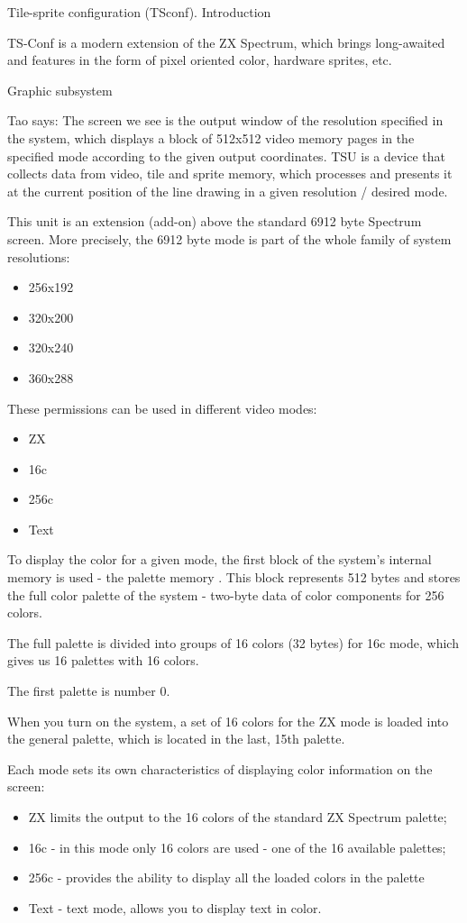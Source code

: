 Tile-sprite configuration (TSconf). Introduction

TS-Conf is a modern extension of the ZX Spectrum, which brings
long-awaited and features in the form of pixel oriented color,
hardware sprites, etc.

Graphic subsystem

Tao says: The screen we see is the output window of the resolution
specified in the system, which displays a block of 512x512 video
memory pages in the specified mode according to the given output
coordinates. TSU is a device that collects data from video, tile and
sprite memory, which processes and presents it at the current position
of the line drawing in a given resolution / desired mode.

This unit is an extension (add-on) above the standard 6912 byte
Spectrum screen. More precisely, the 6912 byte mode is part of the
whole family of system resolutions:
\begin{itemize}
\item 256x192
\item 320x200
\item 320x240
\item 360x288
\end{itemize}

These permissions can be used in different video modes:
\begin{itemize}
\item ZX
\item 16c
\item 256c
\item Text
\end{itemize}

To display the color for a given mode, the first block of the system's
internal memory is used - the palette memory . This block represents
512 bytes and stores the full color palette of the system - two-byte
data of color components for 256 colors.

The full palette is divided into groups of 16 colors (32 bytes) for
16c mode, which gives us 16 palettes with 16 colors.

The first palette is number 0. 

When you turn on the system, a set of 16 colors for the ZX mode is
loaded into the general palette, which is located in the last, 15th
palette.

Each mode sets its own characteristics of displaying color information
on the screen:
\begin{itemize}
\item ZX limits the output to the 16 colors of the standard ZX
  Spectrum palette;
\item 16c - in this mode only 16 colors are used - one of the 16
  available palettes;
\item 256c - provides the ability to display all the loaded colors in
  the palette
\item Text - text mode, allows you to display text in color.
\end{itemize}

